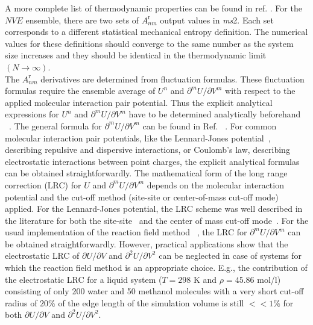 A more complete list of thermodynamic properties can be found in ref. \parencite{SpanBook}. For the $NVE$ ensemble, there are two sets of $A^\text{r}_{nm}$ output values in \textit{ms}2. Each set corresponds to a different statistical mechanical entropy definition.%
The numerical values for these definitions should converge to the same number as the system size increases and they should be identical in the thermodynamic limit $(N \rightarrow \infty)$.\\

The $A^\text{r}_{nm}$ derivatives are determined from fluctuation formulas. These fluctuation formulas require the ensemble average of $U^n$ and ${\partial^m U}/{\partial V^m}$ with respect to the applied molecular interaction pair potential. Thus the explicit analytical expressions for $U^n$ and ${\partial^m U}/{\partial V^m}$ have to be determined analytically beforehand ~\parencite{Lus11, Lus12}. The general formula for ${\partial^m U}/{\partial V^m}$ can be found in Ref. ~\parencite{Lus94b}. For common molecular interaction pair potentials, like the Lennard-Jones potential~\parencite{Allen}, describing repulsive and dispersive interactions, or Coulomb's law, describing electrostatic interactions between point charges, the explicit analytical formulas can be obtained straightforwardly. The mathematical form of the long range correction (LRC) for $U$ and ${\partial^m U}/{\partial V^m}$ depends on the molecular interaction potential and the cut-off method (site-site or center-of-mass cut-off mode) applied. For the Lennard-Jones potential, the LRC scheme was well described in the literature for both the site-site~\parencite{Lus11, Mei06} and the center of mass cut-off mode~\parencite{Lus94b, Lus88}. For the usual implementation of the reaction field method ~\parencite{RFmethod, siteRFmethod}, the LRC for ${\partial^m U}/{\partial V^m}$ can be obtained straightforwardly. However, practical applications show that the electrostatic LRC of ${\partial U}/{\partial V}$ and ${\partial^2 U}/{\partial V^2}$ can be neglected in case of systems for which the reaction field method is an appropriate choice. E.g., the contribution of the electrostatic LRC for a liquid system ($T=298$ K and $\rho= 45.86$ mol/l) consisting of only 200 water and 50 methanol molecules with a very short cut-off radius of $20\%$ of the edge length of the simulation volume is still $<<1\%$ for both ${\partial U}/{\partial V}$ and ${\partial^2 U}/{\partial V^2}$.\\


